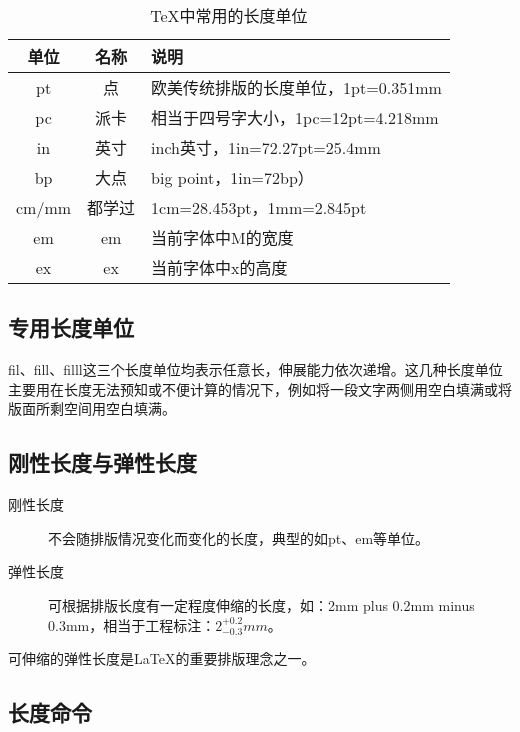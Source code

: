 \begin{table}[!htb]
    \centering
    \caption{\TeX 中常用的长度单位}
    \label{TeX-length}
    \begin{tabular}{ccl}
        \toprule
        单位 & 名称 & 说明\\
        \midrule
        pt & 点 & 欧美传统排版的长度单位，1pt=0.351mm\\
        pc & 派卡 & 相当于四号字大小，1pc=12pt=4.218mm\\
        in & 英寸 & inch英寸，1in=72.27pt=25.4mm\\
        bp & 大点 & big point，1in=72bp）\\
        cm/mm & 都学过 & 1cm=28.453pt，1mm=2.845pt\\
        em & em & 当前字体中M的宽度\\
        ex & ex & 当前字体中x的高度\\
        \bottomrule
    \end{tabular}
\end{table}

\subsection*{专用长度单位}
fil、fill、filll这三个长度单位均表示任意长，伸展能力依次递增。这几种长度单位主要用在长度无法预知或不便计算的情况下，例如将一段文字两侧用空白填满或将版面所剩空间用空白填满。

\subsection*{刚性长度与弹性长度}

\begin{description}
    \item[刚性长度] 不会随排版情况变化而变化的长度，典型的如pt、em等单位。
    \item[弹性长度] 可根据排版长度有一定程度伸缩的长度，如：2mm plus 0.2mm minus 0.3mm，相当于工程标注：$ 2^{+0.2}_{-0.3}mm $。
\end{description}

可伸缩的弹性长度是\LaTeX 的重要排版理念之一。

\subsection*{长度命令}


